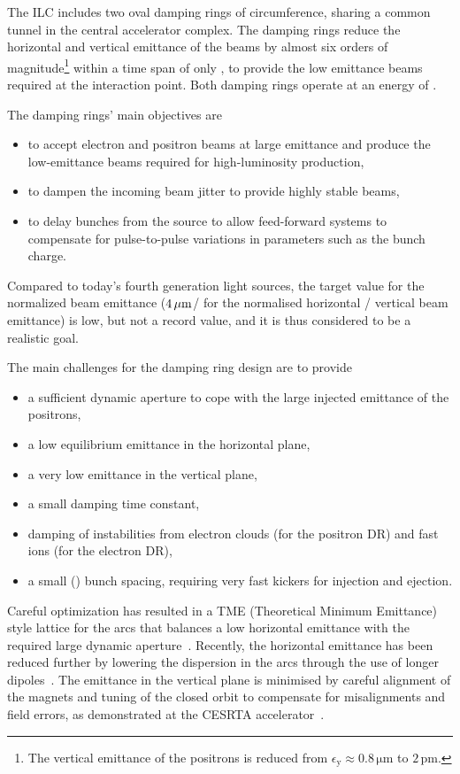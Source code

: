 The ILC includes two oval damping rings of  circumference, sharing a common tunnel in the central accelerator complex.
The damping rings reduce the horizontal and vertical emittance of the beams by almost six orders of magnitude\footnote{The vertical emittance of the positrons is reduced from $\epsilon_{\mathrm{y}} \approx 0.8\,{\mathrm{\mu m}}$ to $2\,{\mathrm{pm}}$.} within a time span of only , to provide the low emittance beams required at the interaction point. 
Both damping rings operate at an energy of .

The damping rings' main objectives are
\begin{itemize} 
\item to accept electron and positron beams at large emittance and produce the low-emittance beams required for high-luminosity production,
\item to dampen the incoming beam jitter to provide highly stable beams,
\item to 
delay bunches from the source to allow feed-forward systems to compensate for pulse-to-pulse variations in parameters such as the bunch charge.
\end{itemize}

Compared to today's fourth generation light sources, the target value for the normalized beam emittance ($4\,{\mathrm{\mu m}}$/ for the normalised horizontal / vertical beam emittance) is low, but not a record value, and it is thus considered to be a realistic goal.

The main challenges for the damping ring design are to provide
\begin{itemize} 
\item a sufficient dynamic aperture to cope with the large injected emittance of the positrons,
\item a low equilibrium emittance in the horizontal plane,
\item a very low emittance in the vertical plane,
\item a small damping time constant,
\item damping of instabilities from electron clouds (for the positron DR) and fast ions (for the electron DR),
\item a small () bunch spacing, requiring very fast kickers for injection and ejection.
\end{itemize}

Careful optimization has resulted in a TME (Theoretical Minimum Emittance) style lattice for the arcs that balances a low horizontal emittance with the required large dynamic aperture~\cite[Chap. 6]{Adolphsen:2013kya}. 
Recently, the horizontal emittance has been reduced further by lowering the dispersion in the arcs through the use of longer dipoles~\cite{bib:cr-0016}.
The emittance in the vertical plane is minimised by careful alignment of the magnets and tuning of the closed orbit to compensate for misalignments and field errors, as demonstrated at the CESRTA accelerator~\cite{Billing:2011zc}.

